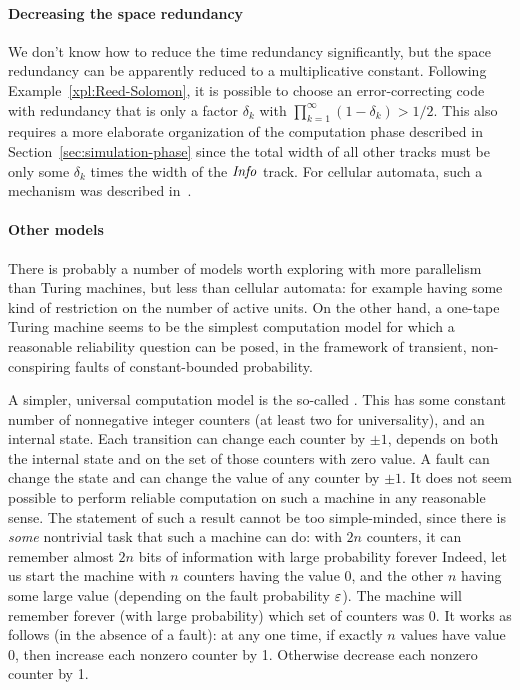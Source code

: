 \documentclass[11pt]{memoir}
\theoremstyle{definition} %
\newcommand{\fld}[1]{\ensuremath{\textit{#1\/}}}
\newcommand{\Info}{\fld{Info}}
\begin{document}
 \paragraph{Decreasing the space redundancy}
 We don't know how to reduce the time redundancy significantly, but
 the space redundancy can be apparently reduced to a multiplicative constant.
 Following Example~\ref{xpl:Reed-Solomon}, it is possible to
 choose an error-correcting code with redundancy that is only a factor \( \delta_{k} \)
 with \( 
   \prod_{k=1}^{\infty}(1-\delta_{k})>1/2
 \).
 This also requires a more elaborate organization of the computation phase described in
 Section~\ref{sec:simulation-phase} since
 the total width of all other tracks must be only some \( \delta_{k} \) times the width
 of the \( \Info \) track.
 For cellular automata, such a mechanism was described in~\cite{GacsSorg01}.

 \paragraph{Other models}
 There is probably a number of models worth exploring with more parallelism than Turing machines, but less
 than cellular automata: for example having some kind of restriction on the number of active units.
 On the other hand, a one-tape Turing machine seems to be the simplest computation model for which a reasonable
 reliability question can be posed, in the framework of transient, non-conspiring faults of constant-bounded
 probability.

 A simpler, universal computation model is the so-called .
 This has some constant number of nonnegative integer counters (at least two for universality), and an internal state.
 Each transition can change each counter by \( \pm 1 \), depends on both the internal state
 and on the set of those counters with zero value.
 A fault can change the state and can change the value of any counter by \( \pm 1 \).
 It does not seem possible to perform reliable computation on such a machine in any reasonable sense.
 The statement of such a result
 cannot be too simple-minded, since there is \emph{some} nontrivial task that such a machine can
 do: with \( 2n \) counters, it can remember almost \( 2n \) bits of information with large probability forever
 Indeed, let us start the machine with \( n \) counters having the value 0, and the other \( n \) having some
 large value (depending on the fault probability \( \varepsilon \)).
 The machine will remember forever (with large probability) which set of counters was 0.
 It works as follows (in the absence of a fault):
 at any one time, if exactly \( n \) values have value 0, then increase each nonzero counter by 1.
 Otherwise decrease each nonzero counter by 1.
 
\end{document}
